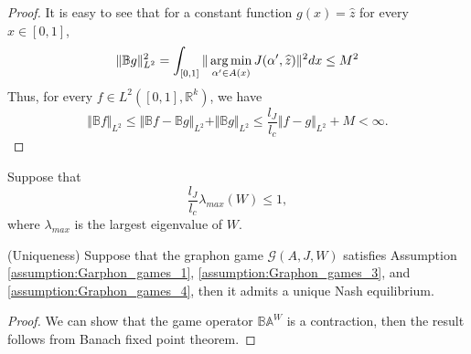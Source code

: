 \begin{proof}
	It is easy to see that for a constant function $g(x) = \hat{z}$ for every $x\in [0,1]$,
	$$
		\Vert \mathbb{B} g \Vert_{L^2}^2 = \int_{[0,1]} \Vert \operatorname*{arg\,min}_{\alpha' \in A(x)} J(\alpha', \widehat{z}) \Vert^2 dx \leq M^2
	$$
	Thus, for every $f \in L^2([0,1], \mathbb{R}^k)$, we have
	$$
		\Vert \mathbb{B}f \Vert_{L^2} \leq \Vert \mathbb{B}f - \mathbb{B} g \Vert_{L^2} + \Vert \mathbb{B}g \Vert_{L^2} \leq \frac{l_J}{l_c} \Vert f - g \Vert_{L^2} + M < \infty. 
	$$
\end{proof}
\begin{assumption}
	Suppose that
	$$
		\frac{l_J}{l_c} \lambda_{max}(W) \leq 1,
	$$
	where $\lambda_{max}$ is the largest eigenvalue of $W$.
\label{assumption:Graphon_games_4}
\end{assumption}

\begin{lemma}(Uniqueness)
	Suppose that the graphon game $\mathcal{G}(A,J, W)$ satisfies Assumption \ref{assumption:Garphon_games_1}, \ref{assumption:Graphon_games_3}, and  \ref{assumption:Graphon_games_4}, then it admits a unique Nash equilibrium.
\label{lemma:Graphon_game_unique_NE}
\end{lemma}

\begin{proof}
	We can show that the game operator $\mathbb{B} \mathbb{A}^W$ is a contraction, then the result follows from Banach fixed point theorem. 
\end{proof}
 